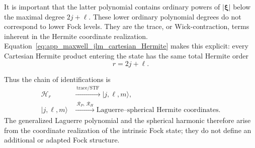 \documentclass[11pt,oneside]{article}
\numberwithin{equation}{section}
\theoremstyle{definition}
\begin{document}
It is important that the latter polynomial contains ordinary powers of
$|\bm\xi|$ below the maximal degree $2j+\ell$.  These lower ordinary
polynomial degrees do not correspond to lower Fock levels.  They are the
trace, or Wick-contraction, terms inherent in the Hermite coordinate
realization.  Equation~\eqref{eq:app_maxwell_jlm_cartesian_Hermite} makes
this explicit: every Cartesian Hermite product entering the state has the
same total Hermite order
\begin{equation}
r=2j+\ell.
\end{equation}

Thus the chain of identifications is
\begin{equation}
\begin{aligned}
\mathscr H_r
&\xrightarrow{\ \mathrm{trace/STF}\ }
|j,\ell,m\rangle,
\\[1mm]
|j,\ell,m\rangle
&\xrightarrow{\ \mathcal R_P,\,\mathcal R_H\ }
\text{Laguerre--spherical Hermite coordinates}.
\end{aligned}
\end{equation}
The generalized Laguerre polynomial and the spherical harmonic therefore
arise from the coordinate realization of the intrinsic Fock state; they do
not define an additional or adapted Fock structure.
\end{document}

